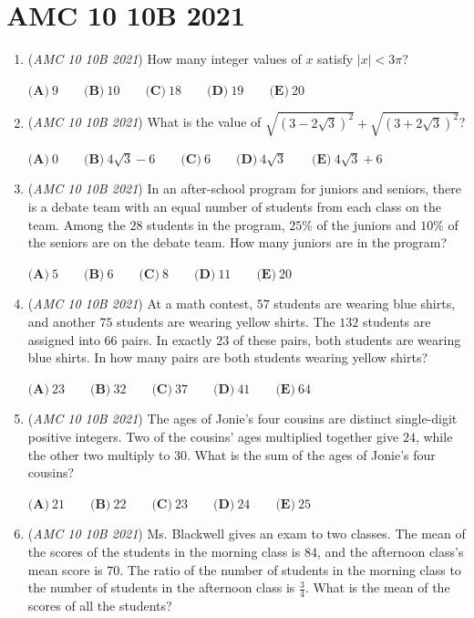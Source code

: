 \section{AMC 10 10B 2021}
        \begin{enumerate}
        	\item (\textit{AMC 10 10B 2021}) How many integer values of $x$ satisfy $|x| < 3\pi$?


 $\textbf{(A)} ~9 \qquad\textbf{(B)} ~10 \qquad\textbf{(C)} ~18 \qquad\textbf{(D)} ~19 \qquad\textbf{(E)} ~20$


	\item (\textit{AMC 10 10B 2021}) What is the value of $\sqrt{\left(3-2\sqrt{3}\right)^2}+\sqrt{\left(3+2\sqrt{3}\right)^2}$?


 $\textbf{(A)} ~0 \qquad\textbf{(B)} ~4\sqrt{3}-6 \qquad\textbf{(C)} ~6 \qquad\textbf{(D)} ~4\sqrt{3} \qquad\textbf{(E)} ~4\sqrt{3} + 6$


	\item (\textit{AMC 10 10B 2021}) In an after-school program for juniors and seniors, there is a debate team with an equal number of students from each class on the team. Among the $28$ students in the program, $25\%$ of the juniors and $10\%$ of the seniors are on the debate team. How many juniors are in the program?


 $\textbf{(A)} ~5 \qquad\textbf{(B)} ~6 \qquad\textbf{(C)} ~8 \qquad\textbf{(D)} ~11 \qquad\textbf{(E)} ~20$


	\item (\textit{AMC 10 10B 2021}) At a math contest, $57$ students are wearing blue shirts, and another $75$ students are wearing yellow shirts. The $132$ students are assigned into $66$ pairs. In exactly $23$ of these pairs, both students are wearing blue shirts. In how many pairs are both students wearing yellow shirts?


 $\textbf{(A)} ~23 \qquad\textbf{(B)} ~32 \qquad\textbf{(C)} ~37 \qquad\textbf{(D)} ~41 \qquad\textbf{(E)} ~64$


	\item (\textit{AMC 10 10B 2021}) The ages of Jonie's four cousins are distinct single-digit positive integers. Two of the cousins' ages multiplied together give $24$, while the other two multiply to $30$. What is the sum of the ages of Jonie's four cousins?


 $\textbf{(A)} ~21 \qquad\textbf{(B)} ~22 \qquad\textbf{(C)} ~23 \qquad\textbf{(D)} ~24 \qquad\textbf{(E)} ~25$


	\item (\textit{AMC 10 10B 2021}) Ms. Blackwell gives an exam to two classes. The mean of the scores of the students in the morning class is $84$, and the afternoon class's mean score is $70$. The ratio of the number of students in the morning class to the number of students in the afternoon class is $\frac{ 3}{4}$. What is the mean of the scores of all the students?



\end{enumerate}
